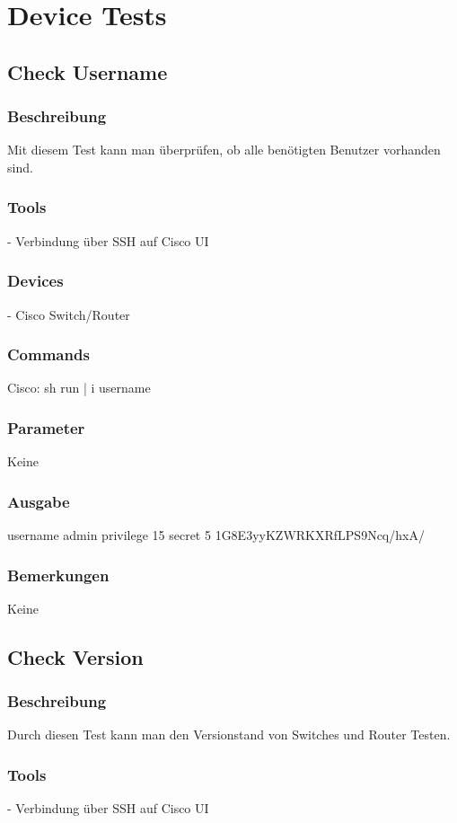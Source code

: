 \documentclass[a4,12pt]{scrartcl}
\begin{document}
\newpage
\section{Device Tests}

\subsection{Check Username}
\subsubsection{Beschreibung}
Mit diesem Test kann man überprüfen, ob alle benötigten Benutzer vorhanden sind.
\subsubsection{Tools}
- Verbindung über SSH auf Cisco UI 
\subsubsection{Devices}
- Cisco Switch/Router
\subsubsection{Commands}
Cisco: sh run | i username
\subsubsection{Parameter}
Keine
\subsubsection{Ausgabe}
username admin privilege 15 secret 5 1G8E3yyKZWRKXRfLPS9Ncq/hxA/
\subsubsection{Bemerkungen}
Keine

\subsection{Check Version}
\subsubsection{Beschreibung}
Durch diesen Test kann man den Versionstand von Switches und Router Testen.
\subsubsection{Tools}
- Verbindung über SSH auf Cisco UI
\end{document}

